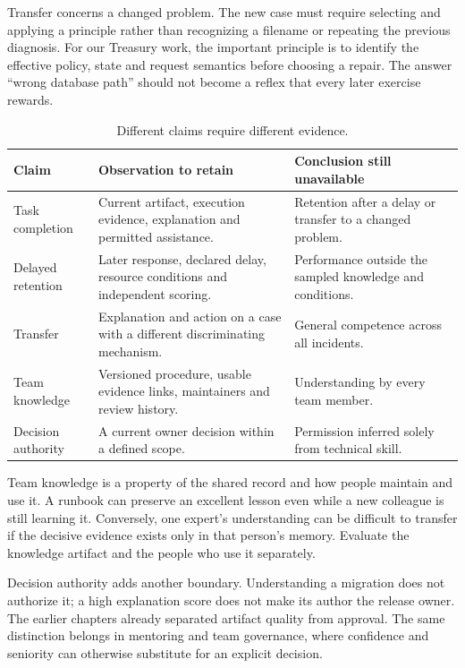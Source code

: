 Transfer concerns a changed problem. The new case must require selecting and applying a principle rather than recognizing a filename or repeating the previous diagnosis. For our Treasury work, the important principle is to identify the effective policy, state and request semantics before choosing a repair. The answer \enquote{wrong database path} should not become a reflex that every later exercise rewards.

\begin{table}[H]\centering\small
\caption{Different claims require different evidence.}\label{tab:ch13-learning-claims}
\begin{tabularx}{\textwidth}{@{}p{}X X@{}}\toprule
\textbf{Claim} & \textbf{Observation to retain} & \textbf{Conclusion still unavailable}\\\midrule
Task completion & Current artifact, execution evidence, explanation and permitted assistance. & Retention after a delay or transfer to a changed problem.\\
Delayed retention & Later response, declared delay, resource conditions and independent scoring. & Performance outside the sampled knowledge and conditions.\\
Transfer & Explanation and action on a case with a different discriminating mechanism. & General competence across all incidents.\\
Team knowledge & Versioned procedure, usable evidence links, maintainers and review history. & Understanding by every team member.\\
Decision authority & A current owner decision within a defined scope. & Permission inferred solely from technical skill.\\\bottomrule
\end{tabularx}
\end{table}

Team knowledge is a property of the shared record and how people maintain and use it. A runbook can preserve an excellent lesson even while a new colleague is still learning it. Conversely, one expert's understanding can be difficult to transfer if the decisive evidence exists only in that person's memory. Evaluate the knowledge artifact and the people who use it separately.

Decision authority adds another boundary. Understanding a migration does not authorize it; a high explanation score does not make its author the release owner. The earlier chapters already separated artifact quality from approval. The same distinction belongs in mentoring and team governance, where confidence and seniority can otherwise substitute for an explicit decision.

